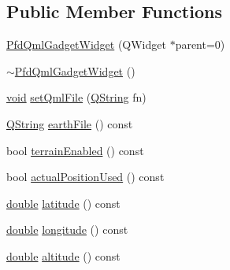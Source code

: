 \subsection*{Public Member Functions}
\begin{DoxyCompactItemize}
\item 
\hyperlink{class_pfd_qml_gadget_widget_a9fbc21128f0cc8099fad2fa39ad3712e}{Pfd\-Qml\-Gadget\-Widget} (Q\-Widget $\ast$parent=0)
\item 
\hyperlink{class_pfd_qml_gadget_widget_a02e8beb8b84aa1aaf39e24a92d3b09b7}{$\sim$\-Pfd\-Qml\-Gadget\-Widget} ()
\item 
\hyperlink{group___u_a_v_objects_plugin_ga444cf2ff3f0ecbe028adce838d373f5c}{void} \hyperlink{class_pfd_qml_gadget_widget_ab7df16298baf43631c32dace9a1dffbf}{set\-Qml\-File} (\hyperlink{group___u_a_v_objects_plugin_gab9d252f49c333c94a72f97ce3105a32d}{Q\-String} fn)
\item 
\hyperlink{group___u_a_v_objects_plugin_gab9d252f49c333c94a72f97ce3105a32d}{Q\-String} \hyperlink{class_pfd_qml_gadget_widget_a6d1fc72b08f98e19caf6dcb41feca575}{earth\-File} () const 
\item 
bool \hyperlink{class_pfd_qml_gadget_widget_a20320a3d382fa1a594e6d685cdae6700}{terrain\-Enabled} () const 
\item 
bool \hyperlink{class_pfd_qml_gadget_widget_a576212ceaba3e38f5084c63fd4adaeaf}{actual\-Position\-Used} () const 
\item 
\hyperlink{_super_l_u_support_8h_a8956b2b9f49bf918deed98379d159ca7}{double} \hyperlink{class_pfd_qml_gadget_widget_ab5b046fc7a3d9a5a9e04e997acf6edb9}{latitude} () const 
\item 
\hyperlink{_super_l_u_support_8h_a8956b2b9f49bf918deed98379d159ca7}{double} \hyperlink{class_pfd_qml_gadget_widget_abb30ff6d422760314ff8791ad251d6bf}{longitude} () const 
\item 
\hyperlink{_super_l_u_support_8h_a8956b2b9f49bf918deed98379d159ca7}{double} \hyperlink{class_pfd_qml_gadget_widget_a65914c682e36cf5c42c97f64b3f08b87}{altitude} () const 
\end{DoxyCompactItemize}
